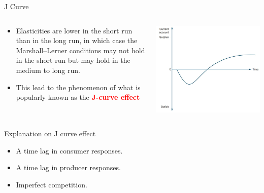 \documentclass[10pt,hyperref={CJKbookmarks=true},xcolor=dvipsnames,aspectratio=169]{beamer}
\begin{document}
\begin{frame}{J Curve}


\begin{columns}[onlytextwidth]
\begin{column}{0.4\textwidth}
\begin{itemize}
\item Elasticities are lower in the short run than in the long run, in which
case the Marshall–Lerner conditions may not hold in the short run
but may hold in the medium to long run.
\item This lead to the phenomenon of what is popularly known as the \textbf{\textcolor{red}{J-curve
effect}}
\end{itemize}

\end{column}
\begin{column}{0.6\textwidth}
\includegraphics[width=0.9\columnwidth]{fig/boptheory/lec08-13}
\end{column}
\end{columns}

\end{frame}

\begin{frame}{Explanation on J curve effect}

\begin{itemize}
\item A time lag in consumer responses.
\item A time lag in producer responses.
\item Imperfect competition. 
\end{itemize}
\end{frame}
\end{document}
